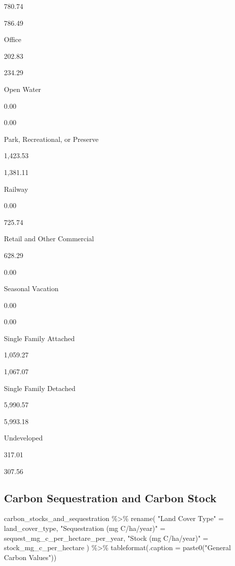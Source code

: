 \documentclass[
]{book}
\newenvironment{Shaded}{\begin{snugshade}}{\end{snugshade}}
\newcommand{\AttributeTok}[1]{\textcolor[rgb]{0.77,0.63,0.00}{#1}}
\newcommand{\FunctionTok}[1]{\textcolor[rgb]{0.00,0.00,0.00}{#1}}
\newcommand{\NormalTok}[1]{#1}
\newcommand{\OtherTok}[1]{\textcolor[rgb]{0.56,0.35,0.01}{#1}}
\newcommand{\SpecialCharTok}[1]{\textcolor[rgb]{0.00,0.00,0.00}{#1}}
\newcommand{\StringTok}[1]{\textcolor[rgb]{0.31,0.60,0.02}{#1}}
\begin{document}
780.74

786.49

Office

202.83

234.29

Open Water

0.00

0.00

Park, Recreational, or Preserve

1,423.53

1,381.11

Railway

0.00

725.74

Retail and Other Commercial

628.29

0.00

Seasonal Vacation

0.00

0.00

Single Family Attached

1,059.27

1,067.07

Single Family Detached

5,990.57

5,993.18

Undeveloped

317.01

307.56

\hypertarget{carbon-sequestration-and-carbon-stock}{%
\subsection{Carbon Sequestration and Carbon Stock}\label{carbon-sequestration-and-carbon-stock}}

\begin{Shaded}
\begin{Highlighting}[]
\NormalTok{carbon\_stocks\_and\_sequestration }\SpecialCharTok{\%\textgreater{}\%}
  \FunctionTok{rename}\NormalTok{(}
    \StringTok{"Land Cover Type"} \OtherTok{=}\NormalTok{ land\_cover\_type,}
    \StringTok{"Sequestration (mg C/ha/year)"} \OtherTok{=}\NormalTok{ sequest\_mg\_c\_per\_hectare\_per\_year,}
    \StringTok{"Stock (mg C/ha/year)"} \OtherTok{=}\NormalTok{ stock\_mg\_c\_per\_hectare}
\NormalTok{  ) }\SpecialCharTok{\%\textgreater{}\%}
  \FunctionTok{tableformat}\NormalTok{(}\AttributeTok{.caption =} \FunctionTok{paste0}\NormalTok{(}\StringTok{"General Carbon Values"}\NormalTok{))}
\end{Highlighting}
\end{Shaded}
\end{document}
